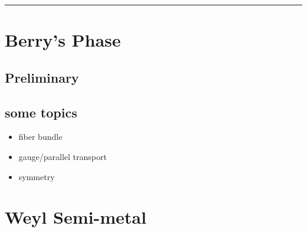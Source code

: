 \documentclass[letterpaper,10pt,english]{sphinxmanual}
\begin{document}
\bigskip\hrule{}\bigskip



\section{Berry's Phase}
\label{TI/Berry's Phase/main:id1}\label{TI/Berry's Phase/main::doc}\label{TI/Berry's Phase/main:berry-s-phase}

\subsection{Preliminary}
\label{TI/Berry's Phase/Preliminary:id1}\label{TI/Berry's Phase/Preliminary::doc}\label{TI/Berry's Phase/Preliminary:preliminary}

\subsection{some topics}
\label{TI/Berry's Phase/main:some-topics}\begin{itemize}
\item {}
fiber bundle

\item {}
gauge/parallel transport

\item {}
symmetry

\end{itemize}


\section{Weyl Semi-metal}
\label{TI/Weyl_semi-metal:id1}\label{TI/Weyl_semi-metal::doc}\label{TI/Weyl_semi-metal:weyl-semi-metal}
\end{document}
